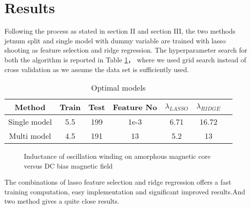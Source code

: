 \documentclass[letterpaper, 10 pt, conference]{ieeeconf}  %
\begin{document}



\section{Results}
Following the process as stated in section II and section III, the two methods jetnum split and single model with dummy variable are trained with lasso shooting as feature selection and  ridge regression. The hyperparameter search for both the algorithm  is reported in Table \ref{table:hyper}， where we used grid search instead of cross validation as we assume the data set is sufficiently used.

\begin{table}[h!]
\scriptsize
\begin{tabular}{| c | c | c | c | c | c | c |}
      \hline
      Method          & Train & Test & Feature No &$\lambda_{LASSO}$ & $\lambda_{RIDGE}$  \\
      \hline 
      Single model   & 5.5  &  199     & 1e-3 &  6.71         & 16.72     \\
      \hline
      Multi model   & 4.5  &  191     & 13    &  5.2          & 13      \\
      \hline 
\end{tabular} 
\caption{Optimal models}
\label{table:hyper}
\end{table}


\begin{figure}[thpb]
      \centering
      \caption{Inductance of oscillation winding on amorphous
       magnetic core versus DC bias magnetic field}
      \label{figurelabel}
   \end{figure}
The combinations of lasso feature selection and ridge  regression offers a fast training computation, easy implementation and significant improved results.And two method gives a quite close results.
\end{document}

